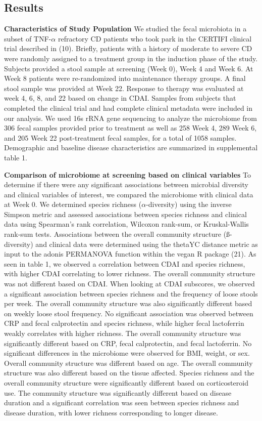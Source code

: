 \documentclass[11pt,]{article}
\begin{document}
\subsection{Results}\label{results}

\textbf{Characteristics of Study Population} We studied the fecal
microbiota in a subset of TNF-\({\alpha}\) refractory CD patients who
took park in the CERTIFI clinical trial described in (10). Briefly,
patients with a history of moderate to severe CD were randomly assigned
to a treatment group in the induction phase of the study. Subjects
provided a stool sample at screening (Week 0), Week 4 and Week 6. At
Week 8 patients were re-randomized into maintenance therapy groups. A
final stool sample was provided at Week 22. Response to therapy was
evaluated at week 4, 6, 8, and 22 based on change in CDAI. Samples from
subjects that completed the clinical trial and had complete clinical
metadata were included in our analysis. We used 16s rRNA gene sequencing
to analyze the microbiome from 306 fecal samples provided prior to
treatment as well as 258 Week 4, 289 Week 6, and 205 Week 22
post-treatment fecal samples, for a total of 1058 samples. Demographic
and baseline disease characteristics are summarized in supplemental
table 1.

\textbf{Comparison of microbiome at screening based on clinical
variables} To determine if there were any significant associations
between microbial diversity and clinical variables of interest, we
compared the microbiome with clinical data at Week 0. We determined
species richness (\({\alpha}\)-diversity) using the inverse Simpson
metric and assessed associations between species richness and clinical
data using Spearman's rank correlation, Wilcoxon rank-sum, or
Kruskal-Wallis rank-sum tests. Associations between the overall
community structure (ß-diversity) and clinical data were determined
using the thetaYC distance metric as input to the adonis PERMANOVA
function within the vegan R package (21). As seen in table 1, we
observed a correlation between CDAI and species richness, with higher
CDAI correlating to lower richness. The overall community structure was
not different based on CDAI. When looking at CDAI subscores, we observed
a significant association between species richness and the frequency of
loose stools per week. The overall community structure was also
significantly different based on weekly loose stool frequency. No
significant association was observed between CRP and fecal calprotectin
and species richness, while higher fecal lactoferrin weakly correlates
with higher richness. The overall community structure was significantly
different based on CRP, fecal calprotectin, and fecal lactoferrin. No
significant differences in the microbiome were observed for BMI, weight,
or sex. Overall community structure was different based on age. The
overall community structure was also different based on the tissue
affected. Species richness and the overall community structure were
significantly different based on corticosteroid use. The community
structure was significantly different based on disease duration and a
significant correlation was seen between species richness and disease
duration, with lower richness corresponding to longer disease.
\end{document}
